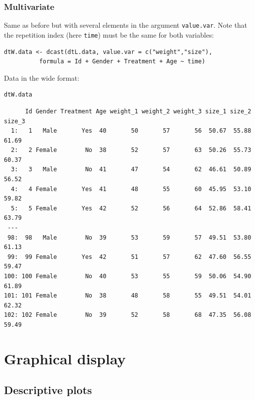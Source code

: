 \documentclass{article}
\begin{document}
\clearpage

\subsubsection{Multivariate}
\label{sec:org0c433b4}


Same as before but with several elements in the argument
\texttt{value.var}. Note that the repetition index (here \texttt{time}) must be the
same for both variables:
\lstset{language=r,label= ,caption= ,captionpos=b,numbers=none}
\begin{lstlisting}
dtW.data <- dcast(dtL.data, value.var = c("weight","size"),
		  formula = Id + Gender + Treatment + Age ~ time)
\end{lstlisting}

Data in the wide format:
\lstset{language=r,label= ,caption= ,captionpos=b,numbers=none}
\begin{lstlisting}
dtW.data
\end{lstlisting}

\begin{verbatim}
      Id Gender Treatment Age weight_1 weight_2 weight_3 size_1 size_2 size_3
  1:   1   Male       Yes  40       50       57       56  50.67  55.88  61.69
  2:   2 Female        No  38       52       57       63  50.26  55.73  60.37
  3:   3   Male        No  41       47       54       62  46.61  50.89  56.52
  4:   4 Female       Yes  41       48       55       60  45.95  53.10  59.82
  5:   5 Female       Yes  42       52       56       64  52.86  58.41  63.79
 ---                                                                         
 98:  98   Male        No  39       53       59       57  49.51  53.80  61.13
 99:  99 Female       Yes  42       51       57       62  47.60  56.55  59.47
100: 100 Female        No  40       53       55       59  50.06  54.90  61.89
101: 101 Female        No  38       48       58       55  49.51  54.01  62.32
102: 102 Female        No  39       52       58       68  47.35  56.08  59.49
\end{verbatim}

\section{Graphical display}
\label{sec:orgf50e382}
\subsection{Descriptive plots}
\label{sec:orge11bf07}
\end{document}
